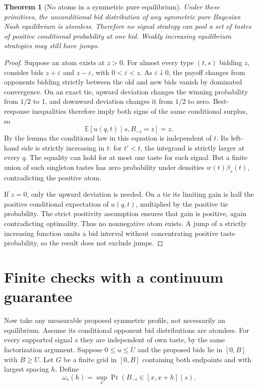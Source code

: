 \documentclass[11pt]{article}
\newtheorem{theorem}{Theorem}
\theoremstyle{definition}
\theoremstyle{remark}
\begin{document}
\begin{theorem}[No atoms in a symmetric pure equilibrium]
Under these primitives, the unconditional bid distribution of any symmetric pure Bayesian Nash equilibrium is atomless. Therefore no signal strategy can pool a set of tastes of positive conditional probability at one bid. Weakly increasing equilibrium strategies may still have jumps.
\end{theorem}
\begin{proof}
Suppose an atom exists at $z>0$. For almost every type $(t,s)$ bidding $z$, consider bids $z+\varepsilon$ and $z-\varepsilon$, with $0<\varepsilon<z$. As $\varepsilon\downarrow0$, the payoff changes from opponents bidding strictly between the old and new bids vanish by dominated convergence. On an exact tie, upward deviation changes the winning probability from $1/2$ to $1$, and downward deviation changes it from $1/2$ to zero. Best-response inequalities therefore imply both signs of the same conditional surplus, so
\[
 \mathbb E[u(q,t)\mid s,B_{-i}=z]=z.
\]
By the lemma the conditional law in this equation is independent of $t$. Its left-hand side is strictly increasing in $t$: for $t'<t$, the integrand is strictly larger at every $q$. The equality can hold for at most one taste for each signal. But a finite union of such singleton tastes has zero probability under densities $w(t)\beta_s(t)$, contradicting the positive atom.

If $z=0$, only the upward deviation is needed. On a tie its limiting gain is half the positive conditional expectation of $u(q,t)$, multiplied by the positive tie probability. The strict positivity assumption ensures that gain is positive, again contradicting optimality. Thus no nonnegative atom exists. A jump of a strictly increasing function omits a bid interval without concentrating positive taste probability, so the result does not exclude jumps.
\end{proof}

\section{Finite checks with a continuum guarantee}
Now take any measurable proposed symmetric profile, not necessarily an equilibrium. Assume its conditional opponent bid distributions are atomless. For every supported signal $s$ they are independent of own taste, by the same factorization argument. Suppose $0\le u\le U$ and the proposed bids lie in $[0,B]$ with $B\ge U$. Let $G$ be a finite grid in $[0,B]$ containing both endpoints and with largest spacing $h$. Define
\[
 \omega_s(h)=\sup_x\Pr(B_{-i}\in[x,x+h]\mid s).
\]
\end{document}
